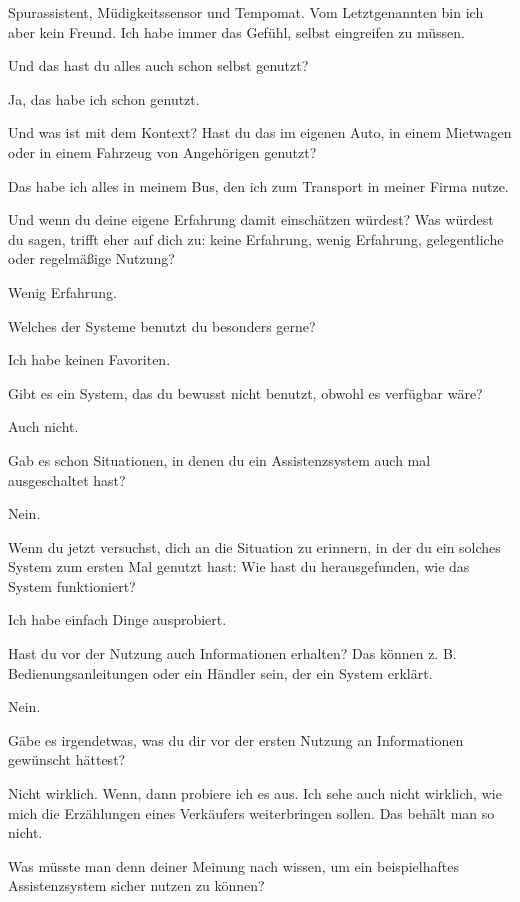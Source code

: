 Spurassistent, Müdigkeitssensor und Tempomat. Vom Letztgenannten bin ich
aber kein Freund. Ich habe immer das Gefühl, selbst eingreifen zu müssen.

\interviewerin
Und das hast du alles auch schon selbst genutzt?

Ja, das habe ich schon genutzt.

\interviewerin
Und was ist mit dem Kontext? Hast du das im eigenen Auto, in einem
Mietwagen oder in einem Fahrzeug von Angehörigen genutzt?

Das habe ich alles in meinem Bus, den ich zum Transport in meiner Firma
nutze.

\interviewerin
Und wenn du deine eigene Erfahrung damit einschätzen würdest? Was
würdest du sagen, trifft eher auf dich zu: keine Erfahrung, wenig
Erfahrung, gelegentliche oder regelmäßige Nutzung?

Wenig Erfahrung.

\interviewerin
Welches der Systeme benutzt du besonders gerne?

Ich habe keinen Favoriten.

\interviewerin
Gibt es ein System, das du bewusst nicht benutzt, obwohl es verfügbar
wäre?

Auch nicht.

\interviewerin
Gab es schon Situationen, in denen du ein Assistenzsystem auch mal
ausgeschaltet hast?

Nein.

\interviewerin
Wenn du jetzt versuchst, dich an die Situation zu erinnern, in der du
ein solches System zum ersten Mal genutzt hast: Wie hast du
herausgefunden, wie das System funktioniert?

Ich habe einfach Dinge ausprobiert.

\interviewerin
Hast du vor der Nutzung auch Informationen erhalten? Das können z. B.
Bedienungsanleitungen oder ein Händler sein, der ein System erklärt.

Nein.

\interviewerin
Gäbe es irgendetwas, was du dir vor der ersten Nutzung an Informationen
gewünscht hättest?

Nicht wirklich. Wenn, dann probiere ich es aus. Ich sehe auch nicht
wirklich, wie mich die Erzählungen eines Verkäufers weiterbringen
sollen. Das behält man so nicht.

\interviewerin
Was müsste man denn deiner Meinung nach wissen, um ein beispielhaftes
Assistenzsystem sicher nutzen zu können?

